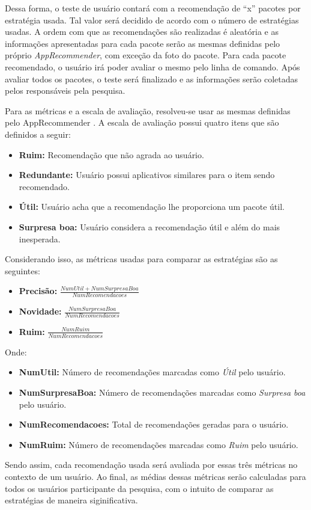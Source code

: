 Dessa forma, o teste de usuário contará com a recomendação de ``x'' pacotes por
estratégia usada. Tal valor será decidido de acordo com o número de estratégias
usadas. A ordem com que
as recomendações são realizadas é aleatória e as informações apresentadas
para cada pacote serão as mesmas definidas pelo próprio \textit{AppRecommender}, com
exceção da foto do pacote. Para cada pacote recomendado, o usuário irá poder
avaliar o mesmo pelo linha de comando. Após avaliar todos os pacotes, o teste
será finalizado e as informações serão coletadas pelos responsáveis pela
pesquisa.

Para as métricas e a escala de avaliação, resolveu-se usar as mesmas definidas
pelo AppRecommender \cite{araujo2011apprecommender}. A escala de avaliação
possui quatro itens que são definidos a seguir:

\begin{itemize}
    \item \textbf{Ruim: } Recomendação que não agrada ao usuário.
    \item \textbf{Redundante: } Usuário possui aplicativos similares para o item
        sendo recomendado.
    \item \textbf{Útil: } Usuário acha que a recomendação lhe proporciona um
            pacote útil.
    \item \textbf{Surpresa boa: } Usuário considera a recomendação útil e além
        do mais inesperada.
\end{itemize}

Considerando isso, as métricas usadas para comparar as estratégias são as
seguintes:

\begin{itemize}
    \item \textbf{Precisão: } $\frac{NumUtil + NumSurpresaBoa}{NumRecomendacoes}$
    \item \textbf{Novidade: } $\frac{NumSurpresaBoa}{NumRecomendacoes}$
    \item \textbf{Ruim: } $\frac{NumRuim}{NumRecomendacoes}$
\end{itemize}

Onde:

\begin{itemize}
    \item \textbf{NumUtil:} Número de recomendações marcadas como \textit{Útil}
        pelo usuário.
    \item \textbf{NumSurpresaBoa:} Número de recomendações marcadas como
        \textit{Surpresa boa} pelo usuário.
    \item \textbf{NumRecomendacoes:} Total de recomendações geradas para o
        usuário.
    \item \textbf{NumRuim:} Número de recomendações marcadas como \textit{Ruim}
        pelo usuário.
\end{itemize}

Sendo assim, cada recomendação usada será avaliada por essas três métricas no
contexto de um usuário. Ao final, as médias dessas métricas serão calculadas para
todos os usuários participante da pesquisa, com o intuito de comparar as
estratégias de maneira siginificativa.
